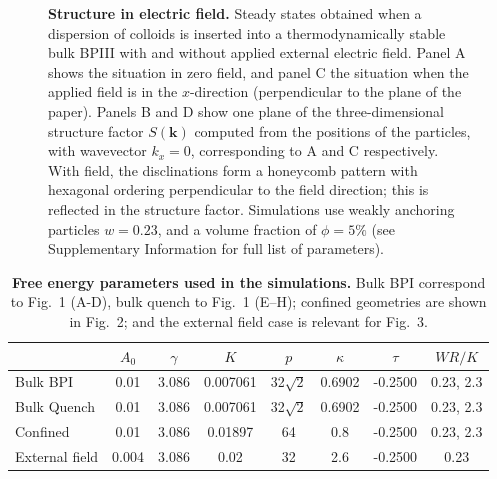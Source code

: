 \documentclass[12pt]{article}
\begin{document}
\begin{figure}
\begin{center}
\end{center}
\caption{\textbf{Structure in electric field.}
Steady states obtained when a dispersion of colloids is inserted
into a thermodynamically stable bulk BPIII with and without applied
external electric field. Panel A shows the situation in zero field, and panel
C the situation when the applied field is in the $x$-direction
(perpendicular to the plane of the paper). Panels B and D show one
plane of the three-dimensional structure factor $S(\mathbf{k})$ computed
from the positions of the particles, with wavevector $k_x = 0$, corresponding
to A and C respectively. With field, the disclinations form a honeycomb
pattern with hexagonal ordering perpendicular to the field direction;
this is reflected in the structure factor.
Simulations use weakly anchoring particles $w=0.23$, and a volume
fraction of $\phi=5\%$ (see Supplementary Information for full list of
parameters). }
\end{figure}

\begin{table}[h]
\begin{center}
\begin{tabular}{|l|c|c|c|c|c|c|c|}
\hline
         & $A_0$ & $\gamma$ & $K$ & $p$ & $\kappa$ & $\tau$ & $WR/K$\\
\hline 
Bulk BPI & 0.01 & 3.086 & 0.007061 & 32$\sqrt{2}$ & 0.6902 & -0.2500 &
0.23, 2.3\\
\hline
Bulk Quench & 0.01 & 3.086 & 0.007061 & 32$\sqrt{2}$ & 0.6902 & -0.2500 &
0.23, 2.3 \\
\hline
Confined & 0.01 & 3.086 & 0.01897 & 64 & 0.8 & -0.2500 & 0.23, 2.3\\
\hline
External field & 0.004& 3.086 & 0.02 & 32 & 2.6 & -0.2500 & 0.23\\ 
\hline
\end{tabular}
\end{center}
\caption{\textbf{Free energy parameters used in the simulations.}
Bulk BPI
correspond to Fig.~1 (A-D), bulk quench to Fig.~1 (E--H); confined
geometries are shown in Fig.~2; and the external field case is
relevant for Fig.~3.}
\label{table:params}
\end{table}
\end{document}
